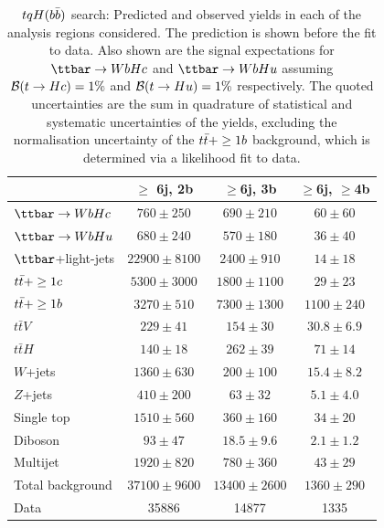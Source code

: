 \begin{table}[htbp]
\begin{center}
\begin{tabular}{l*{3}{c}}
\hline\hline
 & $\geq$ 6j, 2b & $\geq$6j, 3b & $\geq$6j, $\geq$4b \\
\hline
$\Hc$ & $ 760 \pm 250 $ &   $ 690 \pm 210 $ &   $ 60 \pm 60 $ \\ 
$\Hu$ & $ 680 \pm 240 $ &   $ 570 \pm 180 $ &   $ 36 \pm 40 $ \\ 
\hline
$\ttbar$+light-jets  &   $ 22900 \pm 8100 $ &   $ 2400 \pm 910 $ &   $ 14 \pm 18 $ \\ 
$t\bar{t}+\geq1c$  &   $ 5300 \pm 3000 $ &   $ 1800 \pm 1100 $ &   $ 29 \pm 23 $ \\ 
$t\bar{t}+\geq1b$  &   $ 3270 \pm 510 $ &   $ 7300 \pm 1300 $ &   $ 1100 \pm 240 $ \\ 
$t\bar{t}V$  &   $ 229 \pm 41 $ &   $ 154 \pm 30 $ &   $ 30.8 \pm 6.9 $ \\ 
$t\bar{t}H$  &   $ 140 \pm 18 $ &   $ 262 \pm 39 $ &   $ 71 \pm 14 $ \\ 
$W$+jets  &   $ 1360 \pm 630 $ &   $ 200 \pm 100 $ &   $ 15.4 \pm 8.2 $ \\ 
$Z$+jets  &   $ 410 \pm 200 $ &   $ 63 \pm 32 $ &   $ 5.1 \pm 4.0 $ \\ 
Single top  &   $ 1510 \pm 560 $ &   $ 360 \pm 160 $ &   $ 34 \pm 20 $ \\ 
Diboson  &   $ 93 \pm 47 $ &   $ 18.5 \pm 9.6 $ &   $ 2.1 \pm 1.2 $ \\ 
Multijet  &   $ 1920 \pm 820 $ &   $ 780 \pm 360 $ &   $ 43 \pm 29 $ \\ 
\hline
Total background &  $ 37100 \pm 9600 $ &   $ 13400 \pm 2600 $ &   $ 1360 \pm 290 $ \\ 
\hline
Data & 35886  & 14877  & 1335  \\ 
\hline\hline    
\end{tabular}

%
\end{center}
\caption{
$tqH(b\bar{b})$ search: Predicted and observed yields in each of the analysis regions considered.
The prediction is shown before the fit to data. Also shown are the signal expectations for 
$\Hc$ and $\Hu$ assuming $\mathcal{B}(t\to Hc)=1\%$ and $\mathcal{B}(t\to Hu)=1\%$ respectively.
The quoted uncertainties are the sum in quadrature of statistical and systematic uncertainties of the yields, 
excluding the normalisation uncertainty of the $t\bar{t}+\geq1b$ background, which is determined via a likelihood fit to data.
}
\label{tab:Hbb_Prefit_Yields_Unblind}
\end{table} 

